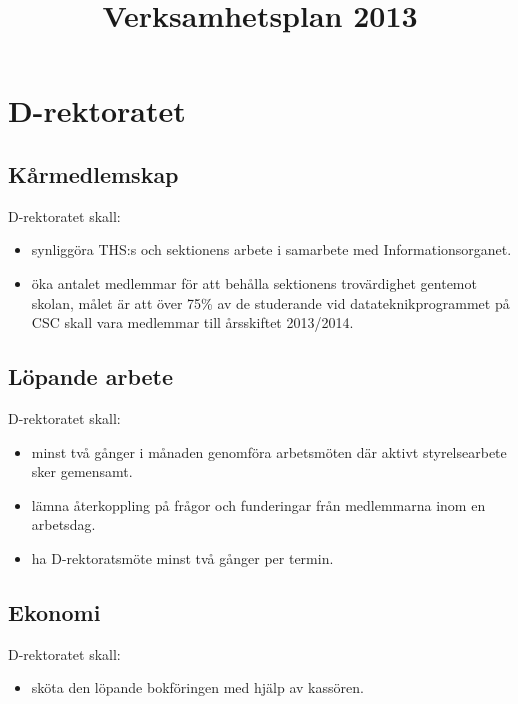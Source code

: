 \documentclass{dgovdoc}
\title{Verksamhetsplan 2013}
\begin{document}
\maketitle

\section{D-rektoratet}

\subsection{Kårmedlemskap}
D-rektoratet skall:
\begin{itemize}
\item synliggöra THS:s och sektionens arbete i samarbete med Informationsorganet.
\item öka antalet medlemmar för att behålla sektionens trovärdighet gentemot skolan, målet är att över 75\% av de studerande vid datateknikprogrammet på CSC skall vara medlemmar till årsskiftet 2013/2014.
\end{itemize}

\subsection{Löpande arbete}
D-rektoratet skall:
\begin{itemize} 
\item minst två gånger i månaden genomföra arbetsmöten där aktivt styrelsearbete sker gemensamt.
\item lämna återkoppling på frågor och funderingar från medlemmarna inom en arbetsdag.
\item ha D-rektoratsmöte minst två gånger per termin.
\end{itemize}

\subsection{Ekonomi}
D-rektoratet skall:
\begin{itemize}
\item sköta den löpande bokföringen med hjälp av kassören.
\end{itemize}
\end{document}
